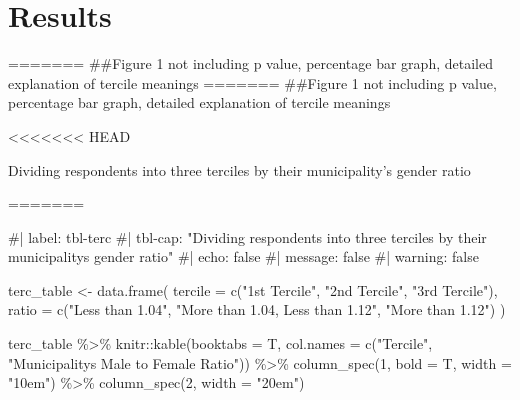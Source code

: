 \documentclass[
]{article}
\newenvironment{Shaded}{\begin{snugshade}}{\end{snugshade}}
\newcommand{\AttributeTok}[1]{\textcolor[rgb]{0.40,0.45,0.13}{#1}}
\newcommand{\CommentTok}[1]{\textcolor[rgb]{0.37,0.37,0.37}{#1}}
\newcommand{\DecValTok}[1]{\textcolor[rgb]{0.68,0.00,0.00}{#1}}
\newcommand{\FunctionTok}[1]{\textcolor[rgb]{0.28,0.35,0.67}{#1}}
\newcommand{\NormalTok}[1]{\textcolor[rgb]{0.00,0.23,0.31}{#1}}
\newcommand{\OtherTok}[1]{\textcolor[rgb]{0.00,0.23,0.31}{#1}}
\newcommand{\SpecialCharTok}[1]{\textcolor[rgb]{0.37,0.37,0.37}{#1}}
\newcommand{\StringTok}[1]{\textcolor[rgb]{0.13,0.47,0.30}{#1}}
\begin{document}
\hypertarget{results}{%
\section{Results}\label{results}}

======= \#\#Figure 1 not including p value, percentage bar graph,
detailed explanation of tercile meanings ======= \#\#Figure 1 not
including p value, percentage bar graph, detailed explanation of tercile
meanings

\clearpage

\renewcommand{\arraystretch}{2}

<<<<<<< HEAD
\hypertarget{tbl-terc}{}
\begin{table}
\caption{\label{tbl-terc}Dividing respondents into three terciles by their municipality's gender
ratio }\tabularnewline

\centering
=======
\begin{Shaded}
\begin{Highlighting}[]
\CommentTok{\#| label: tbl{-}terc}
\CommentTok{\#| tbl{-}cap: "Dividing respondents into three terciles by their municipality\textquotesingle{}s gender ratio"}
\CommentTok{\#| echo: false}
\CommentTok{\#| message: false}
\CommentTok{\#| warning: false}

\NormalTok{terc\_table }\OtherTok{\textless{}{-}} \FunctionTok{data.frame}\NormalTok{(}
  \AttributeTok{tercile =} \FunctionTok{c}\NormalTok{(}\StringTok{"1st Tercile"}\NormalTok{, }\StringTok{"2nd Tercile"}\NormalTok{, }\StringTok{"3rd Tercile"}\NormalTok{),}
  \AttributeTok{ratio =} \FunctionTok{c}\NormalTok{(}\StringTok{"Less than 1.04"}\NormalTok{, }
               \StringTok{"More than 1.04, Less than 1.12"}\NormalTok{,}
               \StringTok{"More than 1.12"}\NormalTok{)}
\NormalTok{)}

\NormalTok{terc\_table }\SpecialCharTok{\%\textgreater{}\%} 
\NormalTok{  knitr}\SpecialCharTok{::}\FunctionTok{kable}\NormalTok{(}\AttributeTok{booktabs =}\NormalTok{ T, }\AttributeTok{col.names =} \FunctionTok{c}\NormalTok{(}\StringTok{"Tercile"}\NormalTok{, }\StringTok{"Municipality\textquotesingle{}s Male to Female Ratio"}\NormalTok{)) }\SpecialCharTok{\%\textgreater{}\%} 
  \FunctionTok{column\_spec}\NormalTok{(}\DecValTok{1}\NormalTok{, }\AttributeTok{bold =}\NormalTok{ T, }\AttributeTok{width =} \StringTok{"10em"}\NormalTok{) }\SpecialCharTok{\%\textgreater{}\%}
  \FunctionTok{column\_spec}\NormalTok{(}\DecValTok{2}\NormalTok{, }\AttributeTok{width =} \StringTok{"20em"}\NormalTok{)}
\end{Highlighting}
\end{Shaded}


\end{table}
\end{document}
